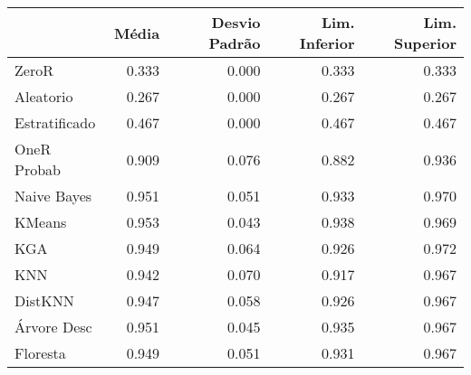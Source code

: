 \begin{table}
\centering
\label{Iris_status_table}
\begin{tabular}{lrrrr}
\toprule
{} & Média & Desvio Padrão & Lim. Inferior & Lim. Superior \\
\midrule
ZeroR         & 0.333 &         0.000 &         0.333 &         0.333 \\
Aleatorio     & 0.267 &         0.000 &         0.267 &         0.267 \\
Estratificado & 0.467 &         0.000 &         0.467 &         0.467 \\
OneR Probab   & 0.909 &         0.076 &         0.882 &         0.936 \\
Naive Bayes   & 0.951 &         0.051 &         0.933 &         0.970 \\
KMeans        & 0.953 &         0.043 &         0.938 &         0.969 \\
KGA           & 0.949 &         0.064 &         0.926 &         0.972 \\
KNN           & 0.942 &         0.070 &         0.917 &         0.967 \\
DistKNN       & 0.947 &         0.058 &         0.926 &         0.967 \\
Árvore Desc   & 0.951 &         0.045 &         0.935 &         0.967 \\
Floresta      & 0.949 &         0.051 &         0.931 &         0.967 \\
\bottomrule
\end{tabular}
\end{table}
